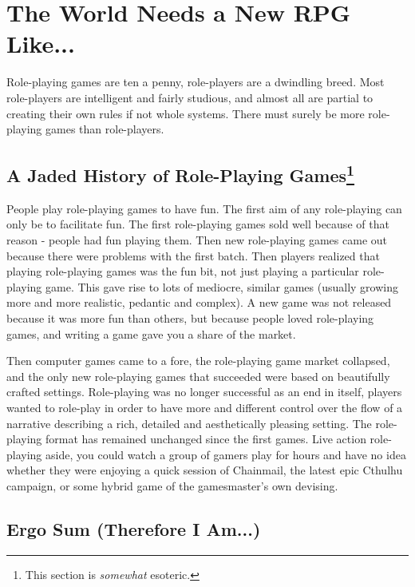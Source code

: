 \documentclass[twoside]{book}
\begin{document}

\chapter{The World Needs a New RPG Like...}

Role-playing games are ten a penny, role-players are a dwindling
breed. Most role-players are intelligent and fairly studious, and
almost all are partial to creating their own rules if not whole
systems. There must surely be more role-playing games than
role-players.

\section{A Jaded History of Role-Playing Games\protect\footnote{This section is {\it somewhat} esoteric.}} 

People play role-playing games to have fun. The first aim of any
role-playing can only be to facilitate fun. The first role-playing
games sold well because of that reason - people had fun playing
them. Then new role-playing games came out because there were problems
with the first batch. Then players realized that playing role-playing
games was the fun bit, not just playing a particular role-playing
game. This gave rise to lots of mediocre, similar games (usually
growing more and more realistic, pedantic and complex). A new game was
not released because it was more fun than others, but because people
loved role-playing games, and writing a game gave you a share of the
market.

Then computer games came to a fore, the role-playing game market
collapsed, and the only new role-playing games that succeeded were
based on beautifully crafted settings. Role-playing was no longer
successful as an end in itself, players wanted to role-play in order
to have more and different control over the flow of a narrative
describing a rich, detailed and aesthetically pleasing setting. The
role-playing format has remained unchanged since the first games. Live
action role-playing aside, you could watch a group of gamers play for
hours and have no idea whether they were enjoying a quick session of
Chainmail, the latest epic Cthulhu campaign, or some hybrid game of
the gamesmaster's own devising.

\section{Ergo Sum (Therefore I Am...)}
\end{document}
